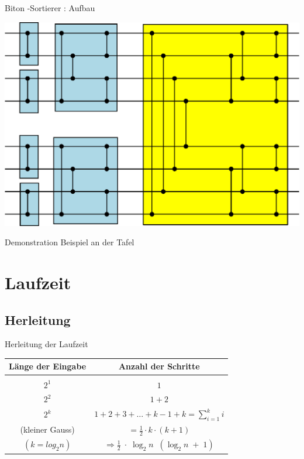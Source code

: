 \documentclass[ucs,9pt]{beamer}
\begin{document}
\begin{frame}{Biton -Sortierer : Aufbau}
    \begin{center}
    		\includegraphics[scale=0.6]{biton2.eps}
    \end{center}
\end{frame}

\begin{frame}{Demonstration}
    Beispiel an der Tafel
\end{frame}

\section{Laufzeit}
\subsection{Herleitung}

\begin{frame}{Herleitung der Laufzeit}
\begin{center}
\begin{tabular}{c|c}
Länge der Eingabe & Anzahl der Schritte \\
\hline \\
 {$2^1$} &  { $1$}\\
 {$2^2$} &  { $1 + 2$}\\
 {$2^k$}&  { $1 + 2 + 3 + … + k-1 + k  = \sum_{i=1}^k i$}\\
 {{\color{gray}(kleiner Gauss)}} &  {$ =\frac{1}{2}\cdot k \cdot (k+1) $} \\
 {{\color{gray}$(k = log_2 n)$}} & {$\Rightarrow \frac{1}{2}\; \cdot\;\log_2 n \;\; (\log_2 n\;+\;1)$} \\
\end{tabular}
\end{center}
\end{frame}
\end{document}
